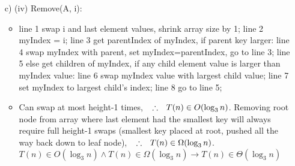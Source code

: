 \documentclass[12pt, oneside]{article}
\newcommand\tab[1][0.25cm]{\hspace*{#1}}
\newcommand\imp{\rightarrow}
\newcommand\thfr{\tab \therefore \tab}
\begin{document}
\begin{itemize}
\begin{itemize}
	\end{itemize}
	\newpage
	
\item [c) (iv)]  
	\tab[0.75cm]Remove(A, i): 
	\begin{itemize}
	\item line 1 \tab	swap i and last element values, shrink array size by 1; \newline
	line 2 \tab myIndex = i; \newline
	line 3 \tab	get parentIndex of myIndex, if parent key larger: \newline	
	line 4 \tab[0.75cm]  swap myIndex with parent, set myIndex=parentIndex, go to line 3; \newline
	line 5 \tab	else get children of myIndex, if any child element value is larger than myIndex value: \newline
	line 6 \tab[0.75cm]	swap myIndex value with largest child value; \newline
	line 7 \tab[0.75cm]	set myIndex to largest child's index; \newline
	line 8 \tab[0.75cm]	go to line 5; \newline
	
	\item Can swap at most height-1 times, $\thfr T(n) \in O(\log_{3}n)$. \newline
	Removing root node from array where last element had the smallest key will always require full height-1 swaps (smallest key placed at root, pushed all the way back down to leaf node), $\thfr T(n) \in \Omega(\log_{3}n)$. \newline
	$T(n) \in O(\log_{3}n) \land T(n) \in \Omega(\log_{3}n) \imp T(n) \in \Theta(\log_{3}n)$
	
	\end{itemize}
	
		
	
	
\end{itemize}
\end{document}
